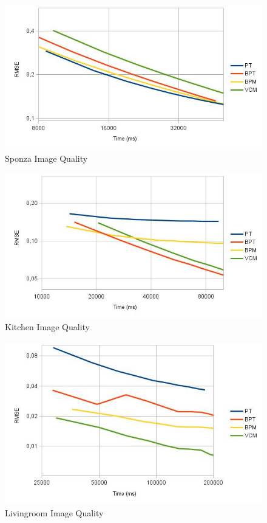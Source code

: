 \begin{figure}[H]
\centering
\includegraphics[width=0.8\linewidth]{img/sponzaImgq.jpg}
\caption{\label{img:sponzaImgq} Sponza Image Quality}
\end{figure}

\begin{figure}[H]
\centering
\includegraphics[width=0.8\linewidth]{img/kitchenImgq.jpg}
\caption{\label{img:kitchenImgq} Kitchen Image Quality}
\end{figure}

\begin{figure}[H]
\centering
\includegraphics[width=0.8\linewidth]{img/livingroomImgq.jpg}
\caption{\label{img:livingroomImgq} Livingroom Image Quality}
\end{figure}


